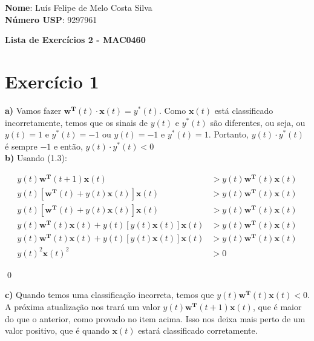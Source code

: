 \documentclass[12pt,letterpaper]{article}
\begin{document}
	
	\textbf{Nome}: Luís Felipe de Melo Costa Silva \\
	\textbf{Número USP}: 9297961 
	
	\begin{center}
		\LARGE \bf
		Lista de Exercícios 2 - MAC0460
	\end{center}
	
	\section*{Exercício 1}
		
	\textbf{a)} Vamos fazer $\mathbf{w}^\mathbf{T}(t) \cdot \mathbf{x}(t) = y^*(t)$. Como $\mathbf{x}(t)$ está classificado incorretamente, temos que os sinais de $y(t)$ e $y^*(t)$ são diferentes, ou seja, ou $y(t) = 1$ e $y^*(t) = -1$ ou $y(t) = -1$ e $y^*(t) = 1$. Portanto, $y(t) \cdot y^*(t)$ é sempre $-1$ e então, $y(t) \cdot y^*(t) < 0$ \\
		
	\textbf{b)} Usando (1.3):
	
	\begin{equation*}
		\begin{split}
			y(t)\mathbf{w}^\mathbf{T}(t+1)\mathbf{x}(t) & > y(t)\mathbf{w}^\mathbf{T}(t)\mathbf{x}(t) \\
			y(t)[\mathbf{w}^\mathbf{T}(t) + y(t)\mathbf{x}(t)]\mathbf{x}(t) & > y(t)\mathbf{w}^\mathbf{T}(t)\mathbf{x}(t) \\
			y(t)[\mathbf{w}^\mathbf{T}(t) + y(t)\mathbf{x}(t)]\mathbf{x}(t) & > y(t)\mathbf{w}^\mathbf{T}(t)\mathbf{x}(t) \\
			y(t)\mathbf{w}^\mathbf{T}(t)\mathbf{x}(t) + y(t)[y(t)\mathbf{x}(t)]\mathbf{x}(t) & > y(t)\mathbf{w}^\mathbf{T}(t)\mathbf{x}(t) \\
			y(t)\mathbf{w}^\mathbf{T}(t)\mathbf{x}(t) + y(t)[y(t)\mathbf{x}(t)]\mathbf{x}(t) & > y(t)\mathbf{w}^\mathbf{T}(t)\mathbf{x}(t) \\
			y(t)^2\mathbf{x}(t)^2 & > 0 
		\end{split}
	\end{equation*}

	\qed
	
	\textbf{c)} Quando temos uma classificação incorreta, temos que $y(t)\mathbf{w}^\mathbf{T}(t)\mathbf{x}(t) < 0$. A próxima atualização nos trará um valor $y(t)\mathbf{w}^\mathbf{T}(t+1)\mathbf{x}(t)$, que é maior do que o anterior, como provado no item acima. Isso nos deixa mais perto de um valor positivo, que é quando $\mathbf{x}(t)$ estará classificado corretamente.
 	
\end{document}
